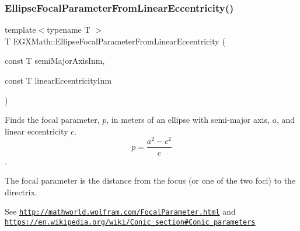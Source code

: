 \subsubsection{\texorpdfstring{Ellipse\+Focal\+Parameter\+From\+Linear\+Eccentricity()}{EllipseFocalParameterFromLinearEccentricity()}}
{\footnotesize\ttfamily template$<$typename T $>$ \\
T E\+G\+X\+Math\+::\+Ellipse\+Focal\+Parameter\+From\+Linear\+Eccentricity (\begin{DoxyParamCaption}\item[{const T}]{semi\+Major\+Axis\+Inm,  }\item[{const T}]{linear\+Eccentricity\+Inm }\end{DoxyParamCaption})}



Finds the focal parameter, $p$, in meters of an ellipse with semi-\/major axis, $a$, and linear eccentricity $c$. \[ p=\frac{a^2-c^2}{c} \]. 

The focal parameter is the distance from the focus (or one of the two foci) to the directrix.

See \href{http://mathworld.wolfram.com/FocalParameter.html}{\tt http\+://mathworld.\+wolfram.\+com/\+Focal\+Parameter.\+html} and \href{https://en.wikipedia.org/wiki/Conic_section#Conic_parameters}{\tt https\+://en.\+wikipedia.\+org/wiki/\+Conic\+\_\+section\#\+Conic\+\_\+parameters}


